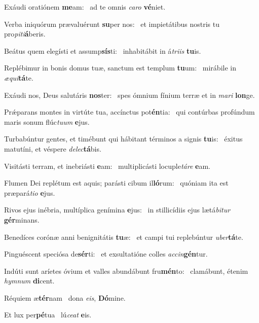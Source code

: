 \item Exáudi oratiónem \textbf{me}am:~\psstar{} ad te omnis \textit{ca}\textit{ro} \textbf{vé}niet.

\item Verba iniquórum prævaluérunt \textbf{su}per nos:~\psstar{} et impietátibus nostris tu pro\textit{pi}\textit{ti}\textbf{á}beris.

\item Beátus quem elegísti et assump\textbf{sís}ti:~\psstar{} inhabitábit in á\textit{tri}\textit{is} \textbf{tu}is.

\item Replébimur in bonis domus tuæ, sanctum est templum \textbf{tu}um:~\psstar{} mirábile in \textit{æ}\textit{qui}\textbf{tá}te.

\item Exáudi nos, Deus salutáris \textbf{nos}ter:~\psstar{} spes ómnium fínium terræ et in \textit{ma}\textit{ri} \textbf{lon}ge.

\item Prǽparans montes in virtúte tua, accínctus pot\textbf{én}tia:~\psstar{} qui contúrbas profúndum maris sonum flúc\textit{tu}\textit{um} \textbf{e}jus.

\item Turbabúntur gentes, et timébunt qui hábitant términos a signis \textbf{tu}is:~\psstar{} éxitus matutíni, et véspere \textit{de}\textit{lec}\textbf{tá}bis.

\item Visitásti terram, et inebriásti \textbf{e}am:~\psstar{} multiplicásti locuple\textit{tá}\textit{re} \textbf{e}am.

\item Flumen Dei replétum est aquis; parásti cibum il\textbf{ló}rum:~\psstar{} quóniam ita est præpará\textit{ti}\textit{o} \textbf{e}jus.

\item Rivos ejus inébria, multíplica genímina \textbf{e}jus:~\psstar{} in stillicídiis ejus lætá\textit{bi}\textit{tur} \textbf{gér}minans.

\item Benedíces corónæ anni benignitátis \textbf{tu}æ:~\psstar{} et campi tui replebúntur \textit{u}\textit{ber}\textbf{tá}te.

\item Pinguéscent speciósa de\textbf{sér}ti:~\psstar{} et exsultatióne colles \textit{ac}\textit{cin}\textbf{gén}tur.

\item Indúti sunt aríetes óvium et valles abundábunt fru\textbf{mén}to:~\psstar{} clamábunt, étenim \textit{hym}\textit{num} \textbf{di}cent.

\item Réquiem æ\textbf{tér}nam~\psstar{} dona \textit{e}\textit{is}, \textbf{Dó}mine.

\item Et lux per\textbf{pé}tua~\psstar{} lú\textit{ce}\textit{at} \textbf{e}is.
